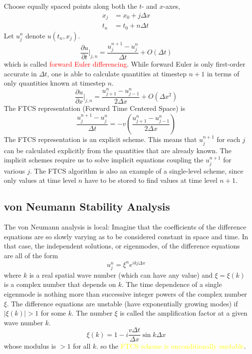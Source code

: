 \documentclass[12pt,a4paper]{article}
\begin{document}
Choose equally spaced points along both the $t$- and $x$-axes,
\begin{align}
x_j &= x_0 +j\Delta x \\
t_n &= t_0 +n\Delta t
\end{align}
Let $u^n_j$ denote $u(t_n , x_j)$. 
\begin{equation}
\frac{\partial u}{\partial t} \Bigg|_{j,n} = \frac{u_{j}^{n+1} -u_{j}^{n} }{\Delta t} +O(\Delta t)
\end{equation}
which is called \textcolor{red}{forward Euler differencing}. While forward Euler is only first-order accurate in $\Delta t$,  one is able to calculate quantities at timestep $n+1$ in terms of only quantities known at timestep $n$. 
\begin{equation}
\frac{\partial u}{\partial x} \Bigg|_{j,n} = \frac{u_{j+1}^{n} -u_{j-1}^{n} }{2\Delta x} +O(\Delta x^2)
\end{equation}
The FTCS representation (Forward Time Centered Space) is
\begin{equation}
\frac{u_{j}^{n+1} -u_{j}^{n} }{\Delta t} = -v \left( \frac{u_{j+1}^{n} -u_{j-1}^{n} }{2\Delta x}\right)
\label{ftcs}
\end{equation}
The FTCS representation is an explicit scheme. This means that $u^{n+1}_j$ for each $j$ can be calculated explicitly from the quantities that are already known. The implicit schemes require us to solve implicit equations coupling
the $u^{n+1}_j$ for various $j$. The FTCS algorithm is also an example of a single-level scheme, since only values at time level $n$ have to be stored to find values at time level $n+1$.

\subsection{von Neumann Stability Analysis}
The von Neumann analysis is local: Imagine that the coefficients of the difference equations are so slowly varying as to be considered constant in space and time. In that case, the independent solutions, or eigenmodes, of the difference equations are all of the form
\begin{equation}
u_j^n = \xi^n e^{ikj\Delta x}
\end{equation}
where $k$ is a real spatial wave number (which can have any value) and $\xi = \xi(k)$ is a complex number that depends on $k$. The time dependence of a single eigenmode is nothing more than successive integer powers of the complex number $\xi$. The difference equations are unstable (have exponentially growing modes) if $|\xi(k)| > 1$ for some $k$. The number $\xi$ is called the amplification factor at a given wave number $k$.
\begin{equation}
\xi(k) = 1-i\frac{v\Delta t}{\Delta x} \sin k \Delta x
\end{equation}
whose modulus is $> 1$ for all $k$. so the \textcolor{yellow}{FTCS scheme is unconditionally unstable}.
\end{document}
